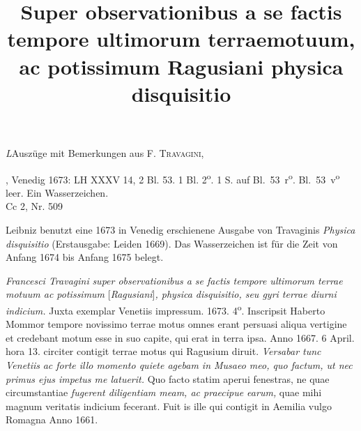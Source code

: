 \begin{Ueberlieferung}%
{\textit{L}}Auszüge mit Bemerkungen aus F. \textsc{Travagini},\cite{01083} \title{Super observationibus a se factis tempore ultimorum terraemotuum, ac potissimum Ragusiani physica disquisitio}, Venedig 1673: LH XXXV 14, 2 Bl. 53. 1 Bl. 2\textsuperscript{o}. 1 S. auf Bl.~53~r\textsuperscript{o}. Bl.~53~v\textsuperscript{o} leer. Ein Wasserzeichen.
\\Cc 2, Nr. 509
\end{Ueberlieferung}

\begin{Datierungsgruende}%
Leibniz benutzt eine 1673 in Venedig erschienene Ausgabe von Travaginis \textit{Physica disquisitio} (Erstausgabe: Leiden 1669)\cite{00112}. Das Wasserzeichen ist für die Zeit von Anfang 1674 bis Anfang 1675 belegt.


\end{Datierungsgruende}
\count{}
            \count{}
\pstartfirst 
[53 r\textsuperscript{o}] \textit{Francesci Travagini}\protect{}\textit{ super observationibus a se factis tempore ultimorum terrae motuum ac potissimum }[\textit{Ragusiani}]\textit{, physica disquisitio, seu gyri terrae diurni indicium.} Juxta exemplar Venetiis\protect{} impressum. 1673. 4\textsuperscript{o}. Inscripsit Haberto Mommor\protect{} tempore novissimo terrae motus omnes erant persuasi aliqua vertigine et credebant motum esse in suo capite, qui erat in terra ipsa. 
\pend
\pstart  
Anno 1667. 6 April. hora 13. circiter contigit terrae motus qui Ragusium\protect{} diruit. \textit{Versabar tunc }\textit{Venetiis}\protect{}\textit{ ac forte illo momento quiete agebam in Musaeo meo, quo factum, ut nec primus ejus impetus me latuerit.} Quo facto statim aperui fenestras, ne quae circumstantiae \textit{fugerent diligentiam meam, ac praecipue earum,} quae mihi magnum veritatis indicium fecerant. Fuit is ille qui contigit in Aemilia\protect{} vulgo Romagna Anno 1661.
